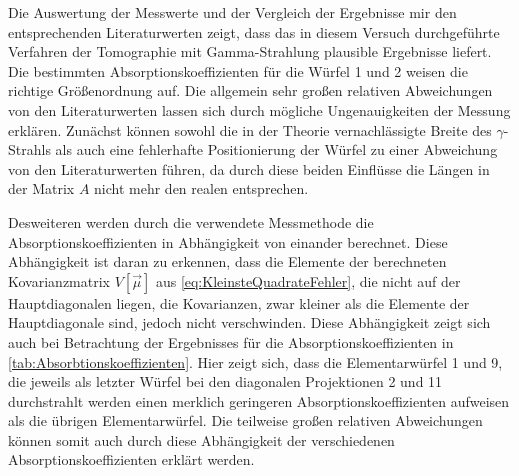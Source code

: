 
Die Auswertung der Messwerte und der Vergleich der Ergebnisse mir den entsprechenden 
Literaturwerten zeigt, dass das in diesem Versuch durchgeführte Verfahren 
der Tomographie mit Gamma-Strahlung plausible Ergebnisse liefert. Die bestimmten 
Absorptionskoeffizienten für die Würfel 1 und 2 weisen die richtige Größenordnung 
auf. Die allgemein sehr großen relativen Abweichungen von den Literaturwerten lassen 
sich durch mögliche Ungenauigkeiten der Messung erklären. 
Zunächst können sowohl die in der Theorie vernachlässigte Breite des $\gamma$-Strahls
als auch eine fehlerhafte Positionierung der Würfel zu einer Abweichung von 
den Literaturwerten führen, da durch diese beiden Einflüsse die Längen in der Matrix $A$ 
nicht mehr den realen entsprechen.

Desweiteren werden durch die verwendete Messmethode die Absorptionskoeffizienten in Abhängigkeit 
von einander berechnet. Diese Abhängigkeit ist daran zu erkennen, dass die Elemente der 
berechneten Kovarianzmatrix $V[\vec{\mu}]$ aus \cref{eq:KleinsteQuadrateFehler}, die nicht auf der Hauptdiagonalen
liegen, die Kovarianzen, zwar kleiner als die Elemente der Hauptdiagonale sind, jedoch nicht verschwinden.
Diese Abhängigkeit zeigt sich auch bei Betrachtung der Ergebnisses für die Absorptionskoeffizienten in 
\cref{tab:Absorbtionskoeffizienten}. Hier zeigt sich, dass die Elementarwürfel 1 und 9, die jeweils
als letzter Würfel bei den diagonalen Projektionen 2 und 11 durchstrahlt werden einen merklich geringeren 
Absorptionskoeffizienten aufweisen als die übrigen Elementarwürfel. Die teilweise großen relativen 
Abweichungen  können somit auch durch diese Abhängigkeit der verschiedenen Absorptionskoeffizienten erklärt werden.
 